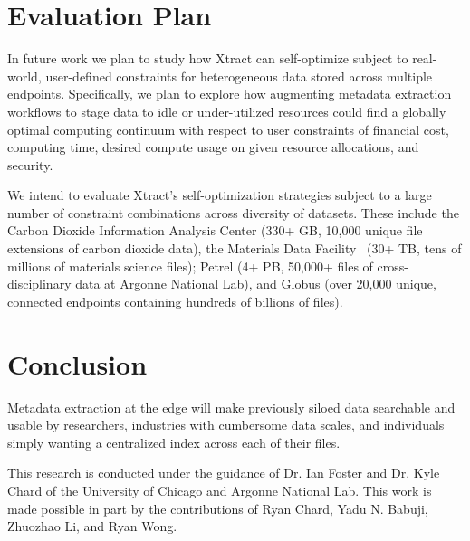 \documentclass[sigconf, 9pt]{acmart}
\newcommand{\name}{Xtract}
\begin{document}
\section{Evaluation Plan}
\label{sec:eval}

In future work we plan to study how \name{} can self-optimize subject to real-world, user-defined constraints for heterogeneous data stored across multiple 
endpoints.  Specifically, we plan to explore how augmenting metadata extraction workflows to stage data to idle or under-utilized resources could 
find a globally optimal computing continuum with respect to user constraints of financial cost, computing time, desired compute usage on 
given resource allocations, and security. 

We intend to evaluate \name{}'s self-optimization strategies subject to a large number of constraint combinations across diversity of datasets. 
These include the Carbon Dioxide Information Analysis Center (330+ GB, 10,000 
unique file extensions of carbon dioxide data), the Materials Data Facility~\cite{ blaiszik2019mdf} (30+ TB, tens of millions of materials science files); 
Petrel (4+ PB, 50,000+ files of cross-disciplinary data at Argonne National Lab), and Globus (over 20,000 unique, connected 
endpoints containing hundreds of billions of files).


\section{Conclusion}
\label{sec:conc}

Metadata extraction at the edge will make previously siloed data searchable and usable by researchers, 
industries with cumbersome data scales, and individuals simply wanting a centralized index across 
each of their files. 


\begin{acks}

This research is conducted under the guidance of Dr. Ian Foster and Dr. Kyle Chard of the 
University of Chicago and Argonne National Lab. This work is made possible in part by the contributions
of Ryan Chard, Yadu N. Babuji, Zhuozhao Li, and Ryan Wong. 


\end{acks}


\end{document}

